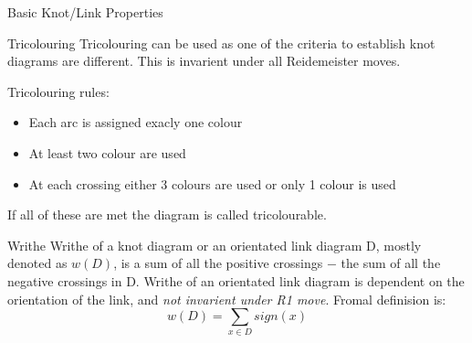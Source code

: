 \documentclass[12pt, letterpaper]{article}
\begin{document}
\begin{section}{Basic Knot/Link Properties}

  \begin{subsection}{Tricolouring}
    Tricolouring can be used as one of the criteria to establish knot diagrams are different.
    This is invarient under all Reidemeister moves.

    Tricolouring rules:
    \begin{itemize}
      \item Each arc is assigned exacly one colour
      \item At least two colour are used
      \item At each crossing either 3 colours are used or only 1 colour is used
    \end{itemize}
    If all of these are met the diagram is called tricolourable.
  \end{subsection}

  \begin{subsection}{Writhe}
    Writhe of a knot diagram or an orientated link diagram D, mostly denoted as \(w(D)\),
    is a sum of all the positive crossings \(-\) the sum of all the negative crossings in D.
    Writhe of an orientated link diagram is dependent on the orientation of the link,
    and \emph{not invarient under R1 move}.
    Fromal definision is: \[w(D) = \sum_{x \in D} sign(x)\]
  \end{subsection}

\end{section}
\end{document}
